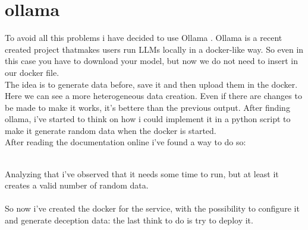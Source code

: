 \section{ollama}
To avoid all this problems i have decided to use Ollama \cite{ollama}. Ollama is a recent created project thatmakes users run LLMs locally in a docker-like way. So even in this case you have to download your model, but now we do not need to insert in our docker file.
\\
The idea is to generate data before, save it and then upload them in the docker.
Here we can see a more heterogeneous data creation. Even if there are changes to be made to make it works, it's bettere than the previous output.
After finding ollama, i've started to think on how i could implement it in a python script to make it generate random data when the docker is started.
\\
After reading the documentation online i've found a way to do so:
\begin{mdframed}[backgroundcolor=bpy]

\end{mdframed}

\\
Analyzing that i've observed that it needs some time to run, but at least it creates a valid number of random data. 
\\\\
So now i've created the docker for the service, with the possibility to configure it and generate deception data: the last think to do is try to deploy it.
